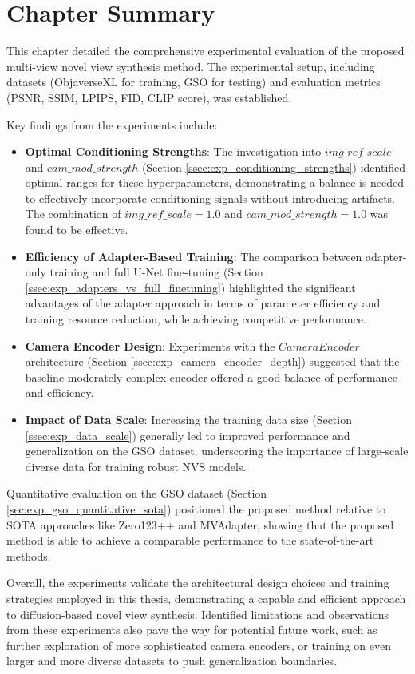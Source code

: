 \section{Chapter Summary}\label{sec:exp_summary}
This chapter detailed the comprehensive experimental evaluation of the proposed multi-view novel view synthesis method. The experimental setup, including datasets (ObjaverseXL for training, GSO for testing) and evaluation metrics (PSNR, SSIM, LPIPS, FID, CLIP score), was established.

Key findings from the experiments include:
\begin{itemize}
  \item \textbf{Optimal Conditioning Strengths}: The investigation into $img\_ref\_scale$ and $cam\_mod\_strength$ (Section \ref{ssec:exp_conditioning_strengths}) identified optimal ranges for these hyperparameters, demonstrating a balance is needed to effectively incorporate conditioning signals without introducing artifacts. The combination of $img\_ref\_scale=1.0$ and $cam\_mod\_strength=1.0$ was found to be effective.
  \item \textbf{Efficiency of Adapter-Based Training}: The comparison between adapter-only training and full U-Net fine-tuning (Section \ref{ssec:exp_adapters_vs_full_finetuning}) highlighted the significant advantages of the adapter approach in terms of parameter efficiency and training resource reduction, while achieving competitive performance.
  \item \textbf{Camera Encoder Design}: Experiments with the $CameraEncoder$ architecture (Section \ref{ssec:exp_camera_encoder_depth}) suggested that the baseline moderately complex encoder offered a good balance of performance and efficiency.
  \item \textbf{Impact of Data Scale}: Increasing the training data size (Section \ref{ssec:exp_data_scale}) generally led to improved performance and generalization on the GSO dataset, underscoring the importance of large-scale diverse data for training robust NVS models.
\end{itemize}

Quantitative evaluation on the GSO dataset (Section \ref{sec:exp_gso_quantitative_sota}) positioned the proposed method relative to SOTA approaches like Zero123++ and MVAdapter, showing that the proposed method is able to achieve a comparable performance to the state-of-the-art methods.

Overall, the experiments validate the architectural design choices and training strategies employed in this thesis, demonstrating a capable and efficient approach to diffusion-based novel view synthesis. Identified limitations and observations from these experiments also pave the way for potential future work, such as further exploration of more sophisticated camera encoders, or training on even larger and more diverse datasets to push generalization boundaries.